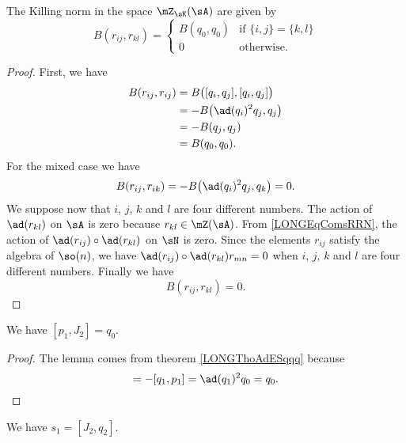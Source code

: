 \begin{proposition}
	The Killing norm in the space $\mZ_{\sK}(\sA)$ are given by
	\begin{equation}
		B(r_{ij},r_{kl})=\begin{cases}
			B(q_0,q_0)	&	\text{if }\{ i,j \}=\{ k,l \}\\
			0	&	 \text{otherwise}.
		\end{cases}
	\end{equation}
\end{proposition}

\begin{proof}
	First, we have
	\begin{equation}
		\begin{aligned}[]
			B(r_{ij},r_{ij})&=B\big( [q_i,q_j],[q_i,q_j] \big)\\
					&=-B\big( \ad(q_i)^2q_j,q_j \big)\\
					&=-B(q_j,q_j)\\
					&=B(q_0,q_0).
		\end{aligned}
	\end{equation}
	For the mixed case we have
	\begin{equation}	
			B(r_{ij},r_{ik})=-B\big( \ad(q_i)^2q_j,q_k \big)=0.
	\end{equation}
	We suppose now that $i$, $j$, $k$ and $l$ are four different numbers. The action of $\ad(r_{kl})$ on $\sA$ is zero because $r_{kl}\in\mZ(\sA)$. From \eqref{LONGEqComsRRN}, the action of $\ad(r_{ij})\circ\ad(r_{kl})$ on $\sN$ is zero. Since the elements $r_{ij}$ satisfy the algebra of $\so(n)$, we have $\ad(r_{ij})\circ\ad(r_{kl})r_{mn}=0$ when $i$, $j$, $k$ and $l$ are four different numbers. Finally we have
	\begin{equation}
		B(r_{ij},r_{kl})=0.
	\end{equation}
\end{proof}

\begin{lemma}		\label{LONGLempunjdeuxqzero}
	We have $[p_1,J_2]=q_0$.
\end{lemma}

\begin{proof}
	The lemma comes from theorem \ref{LONGThoAdESqqq} because
	\begin{equation}
		[p_1,J_2]=-[q_1,p_1]=\ad(q_1)^2q_0=q_0.
	\end{equation}
\end{proof}

\begin{lemma}				 \label{LONGlemJDeuxqDeuxsUn}
	We have $s_1=[J_2,q_2]$.
\end{lemma}

